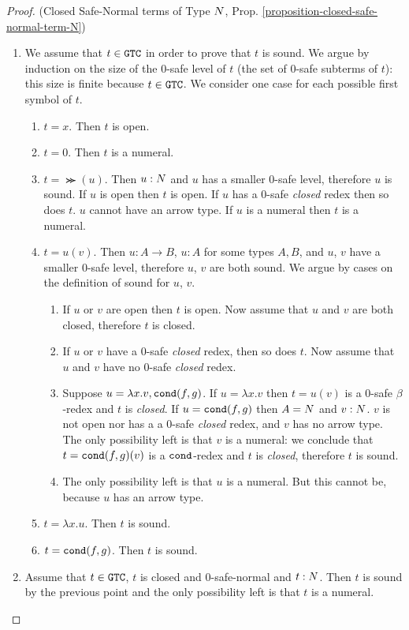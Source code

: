 \begin{proof}(Closed Safe-Normal terms of Type ${N}$, 
Prop. \ref{proposition-closed-safe-normal-term-N})
\begin{enumerate}
\item
We assume that $t \in {\tt GTC}$ in order to prove that $t$ is sound.
We argue by  induction on the size of the $0$-safe level of $t$ (the set of $0$-safe subterms
of $t$): this size is finite because $t \in {\tt GTC}$. 
We consider one case for each possible first symbol of $t$.

\begin{enumerate}
\item
$t =x$. Then $t$ is open.

\item
$t=0$. Then $t$ is a numeral.

\item
$t = \Succ(u)$. Then $u:{N}$ and $u$ has a smaller $0$-safe level, therefore $u$ is sound. 
If $u$ is open then $t$ is open. If $u$ has a $0$-safe \emph{closed} 
redex then so does $t$. $u$ cannot have an arrow type. If $u$
is a numeral then $t$ is a numeral.

\item
$t=u(v)$. Then $u:A \rightarrow B$, $u:A$ for some types $A, B$, 
and $u$, $v$ have a smaller $0$-safe level, therefore $u$, $v$ are both sound. 
We argue by cases on the definition of sound for $u$, $v$.
\begin{enumerate}
\item
If $u$ or $v$ are open then $t$ is open. 
Now assume that $u$ and $v$ are both closed, therefore $t$ is closed.
\item
If $u$ or $v$ have a $0$-safe \emph{closed} redex, then so does $t$.
Now assume that $u$ and $v$ have no $0$-safe \emph{closed} redex.
\item
Suppose $u = \lambda x.v, {\tt cond}(f,g)$. 
If $u = \lambda x.v$ then $t=u(v)$ is a $0$-safe $\beta$-redex and $t$ is \emph{closed}.
If $u = {\tt cond}(f,g)$ then $A = {N}$ and $v:{N}$. 
$v$ is not open nor has a a $0$-safe \emph{closed} redex, and $v$ has no arrow type. 
The only possibility left is that $v$ is a numeral: 
we conclude that $t={\tt cond}(f,g)(v)$ is a ${\tt cond}$-redex and $t$ is \emph{closed},
therefore $t$ is sound.
\item
The only possibility left is that $u$ is a numeral. 
But this cannot be, because $u$ has an arrow type.
\end{enumerate}

\item
$t = \lambda x.u$. Then $t$ is sound.

\item
$t = {\tt cond}(f,g)$. Then $t$ is sound.
\end{enumerate}

\item
Assume that $t \in {\tt GTC}$, $t$ is closed and $0$-safe-normal and $t:{N}$.
Then $t$ is sound by the previous point and the only possibility left is that $t$ is 
a numeral.
\end{enumerate}
\end{proof}




